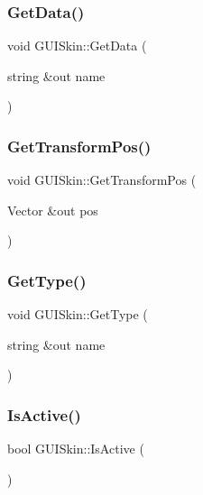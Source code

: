 \hypertarget{class_g_u_i_skin_a5dac4c19b123e20be1a609e9744efcde}{}\label{class_g_u_i_skin_a5dac4c19b123e20be1a609e9744efcde} 
\subsubsection{\texorpdfstring{Get\+Data()}{GetData()}}
{\footnotesize\ttfamily void G\+U\+I\+Skin\+::\+Get\+Data (\begin{DoxyParamCaption}\item[{string \&out}]{name }\end{DoxyParamCaption})}

\hypertarget{class_g_u_i_skin_ace1952be2da072e0f1ad368c062abc1d}{}\label{class_g_u_i_skin_ace1952be2da072e0f1ad368c062abc1d} 
\subsubsection{\texorpdfstring{Get\+Transform\+Pos()}{GetTransformPos()}}
{\footnotesize\ttfamily void G\+U\+I\+Skin\+::\+Get\+Transform\+Pos (\begin{DoxyParamCaption}\item[{Vector \&out}]{pos }\end{DoxyParamCaption})}

\hypertarget{class_g_u_i_skin_a3e12697ba2e794f3ee125fd78432dc00}{}\label{class_g_u_i_skin_a3e12697ba2e794f3ee125fd78432dc00} 
\subsubsection{\texorpdfstring{Get\+Type()}{GetType()}}
{\footnotesize\ttfamily void G\+U\+I\+Skin\+::\+Get\+Type (\begin{DoxyParamCaption}\item[{string \&out}]{name }\end{DoxyParamCaption})}

\hypertarget{class_g_u_i_skin_a7f735b1d191104140cf75b80e48cbf09}{}\label{class_g_u_i_skin_a7f735b1d191104140cf75b80e48cbf09} 
\subsubsection{\texorpdfstring{Is\+Active()}{IsActive()}}
{\footnotesize\ttfamily bool G\+U\+I\+Skin\+::\+Is\+Active (\begin{DoxyParamCaption}{ }\end{DoxyParamCaption})}

